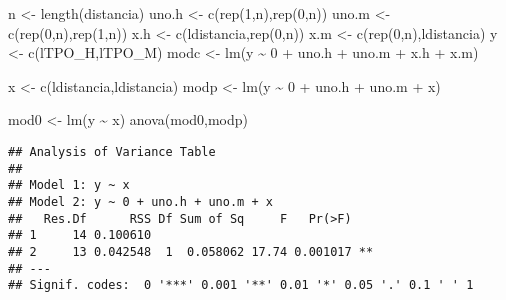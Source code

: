\documentclass[
]{article}
\newenvironment{Shaded}{\begin{snugshade}}{\end{snugshade}}
\newcommand{\DecValTok}[1]{\textcolor[rgb]{0.00,0.00,0.81}{#1}}
\newcommand{\FunctionTok}[1]{\textcolor[rgb]{0.00,0.00,0.00}{#1}}
\newcommand{\NormalTok}[1]{#1}
\newcommand{\OtherTok}[1]{\textcolor[rgb]{0.56,0.35,0.01}{#1}}
\newcommand{\SpecialCharTok}[1]{\textcolor[rgb]{0.00,0.00,0.00}{#1}}
\begin{document}
\begin{Shaded}
\begin{Highlighting}[]
\NormalTok{n }\OtherTok{\textless{}{-}} \FunctionTok{length}\NormalTok{(distancia)}
\NormalTok{uno.h }\OtherTok{\textless{}{-}} \FunctionTok{c}\NormalTok{(}\FunctionTok{rep}\NormalTok{(}\DecValTok{1}\NormalTok{,n),}\FunctionTok{rep}\NormalTok{(}\DecValTok{0}\NormalTok{,n))}
\NormalTok{uno.m }\OtherTok{\textless{}{-}} \FunctionTok{c}\NormalTok{(}\FunctionTok{rep}\NormalTok{(}\DecValTok{0}\NormalTok{,n),}\FunctionTok{rep}\NormalTok{(}\DecValTok{1}\NormalTok{,n))}
\NormalTok{x.h }\OtherTok{\textless{}{-}} \FunctionTok{c}\NormalTok{(ldistancia,}\FunctionTok{rep}\NormalTok{(}\DecValTok{0}\NormalTok{,n))}
\NormalTok{x.m }\OtherTok{\textless{}{-}} \FunctionTok{c}\NormalTok{(}\FunctionTok{rep}\NormalTok{(}\DecValTok{0}\NormalTok{,n),ldistancia)}
\NormalTok{y }\OtherTok{\textless{}{-}} \FunctionTok{c}\NormalTok{(lTPO\_H,lTPO\_M)}
\NormalTok{modc }\OtherTok{\textless{}{-}} \FunctionTok{lm}\NormalTok{(y }\SpecialCharTok{\textasciitilde{}} \DecValTok{0} \SpecialCharTok{+}\NormalTok{ uno.h }\SpecialCharTok{+}\NormalTok{ uno.m }\SpecialCharTok{+}\NormalTok{ x.h }\SpecialCharTok{+}\NormalTok{ x.m)}
\end{Highlighting}
\end{Shaded}

\begin{Shaded}
\begin{Highlighting}[]
\NormalTok{x }\OtherTok{\textless{}{-}} \FunctionTok{c}\NormalTok{(ldistancia,ldistancia)}
\NormalTok{modp }\OtherTok{\textless{}{-}} \FunctionTok{lm}\NormalTok{(y }\SpecialCharTok{\textasciitilde{}} \DecValTok{0} \SpecialCharTok{+}\NormalTok{ uno.h }\SpecialCharTok{+}\NormalTok{ uno.m }\SpecialCharTok{+}\NormalTok{ x)}
\end{Highlighting}
\end{Shaded}

\begin{Shaded}
\begin{Highlighting}[]
\NormalTok{mod0 }\OtherTok{\textless{}{-}} \FunctionTok{lm}\NormalTok{(y }\SpecialCharTok{\textasciitilde{}}\NormalTok{ x)}
\FunctionTok{anova}\NormalTok{(mod0,modp)}
\end{Highlighting}
\end{Shaded}

\begin{verbatim}
## Analysis of Variance Table
## 
## Model 1: y ~ x
## Model 2: y ~ 0 + uno.h + uno.m + x
##   Res.Df      RSS Df Sum of Sq     F   Pr(>F)   
## 1     14 0.100610                               
## 2     13 0.042548  1  0.058062 17.74 0.001017 **
## ---
## Signif. codes:  0 '***' 0.001 '**' 0.01 '*' 0.05 '.' 0.1 ' ' 1
\end{verbatim}
\end{document}
